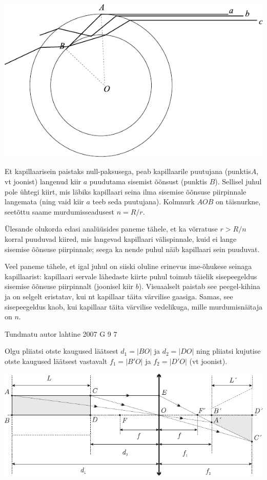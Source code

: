 \documentclass[11pt, twoside]{article}
\begin{document}
{{\ifSolution
\begin{center}
	\includegraphics[width=\linewidth]{2009-lahg-08-lah}
\end{center}

Et kapillaarisein paistaks null-paksusega, peab kapillaarile puutujana (punktis$A$, vt joonist) langenud kiir $a$ puudutama sisemist õõnsust (punktis $B$). Sellisel juhul pole ühtegi kiirt, mis läbiks kapillaari seina ilma sisemise õõnsuse piirpinnale langemata (ning vaid kiir $a$ teeb seda puutujana). Kolmnurk $AOB$ on täisnurkne, seetõttu saame murdumisseadusest $n= R/r$. 

Ülesande olukorda edasi analüüsides paneme tähele, et ka võrratuse $r> R/n$ korral puuduvad kiired, mis langevad kapillaari välispinnale, kuid ei lange sisemise õõnsuse piirpinnale; seega ka nende puhul näib kapillaari sein puuduvat. 

Veel paneme tähele, et igal juhul on siiski oluline erinevus ime-õhukese seinaga kapillaarist: kapillaari servale lähedaste kiirte puhul toimub täielik sisepeegeldus sisemise õõnsuse piirpinnalt (joonisel kiir $b$). Visuaalselt paistab see peegel-kihina ja on selgelt eristatav, kui nt kapillaar täita värvilise gaasiga. Samas, see sisepeegeldus kaob, kui kapillaar täita värvilise vedelikuga, mille murdumisnäitaja on $n$.
\fi
}

{Tundmatu autor} %
{lahtine} %
{2007} %
{G 9} %
{7} %
{

\ifSolution
Olgu pliiatsi otste kaugused läätsest $d_1 = |BO|$ ja $d_2 = |DO|$ ning pliiatsi kujutise otste kaugused läätsest vastavalt $f_1 = |B'O|$ ja $f_2 = |D'O|$ (vt joonist).

\begin{center}
	\includegraphics[width=\linewidth]{2007-lahg-09-lah}
\end{center}

}}
\end{document}

